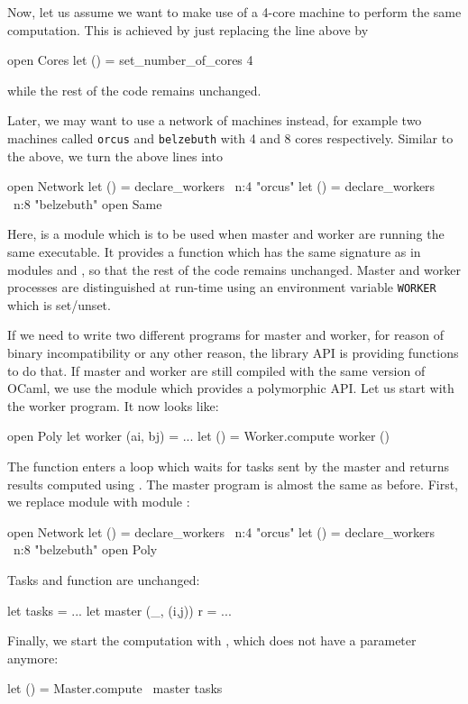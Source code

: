\documentclass[a4paper,12pt]{article}
\newcommand{\Ocaml}{OCaml}
\begin{document}
Now, let us assume we want to make use of a 4-core machine to perform
the same computation. 
This is achieved by just replacing the line above by
\begin{ocaml}
  open Cores
  let () = set_number_of_cores 4
\end{ocaml}
while the rest of the code remains unchanged.

Later, we may want to use a network of machines instead, for example
two machines called \texttt{orcus} and \texttt{belzebuth} with 4 and 8
cores respectively. Similar to the above, we turn the above lines into
\begin{ocaml}
  open Network
  let () = declare_workers ~n:4 "orcus"
  let () = declare_workers ~n:8 "belzebuth"
  open Same
\end{ocaml}
Here,  is a module which is to be used when master and worker
are running the same executable. It provides a  function
which has the same signature as in modules  and
, so that the rest of the code remains unchanged. Master and
worker processes are distinguished at run-time using an environment
variable \texttt{WORKER} which is set/unset.

If we need to write two different programs for master and worker, for
reason of binary incompatibility or any other reason, the library API
is providing functions to do that. If master and worker are still
compiled with the same version of \Ocaml, we use the  module
which provides a polymorphic API. Let us start with the worker program.
It now looks like:
\begin{ocaml}
  open Poly
  let worker (ai, bj) = ...
  let () = Worker.compute worker ()
\end{ocaml}
The  function enters a loop which waits for
tasks sent by the master and returns results computed using .
The master program is almost the same as before. First, we replace
module  with module :
\begin{ocaml}
  open Network
  let () = declare_workers ~n:4 "orcus"
  let () = declare_workers ~n:8 "belzebuth"
  open Poly
\end{ocaml}
Tasks and  function are unchanged:
\begin{ocaml}
  let tasks = ...
  let master (_, (i,j)) r = ...
\end{ocaml}
Finally, we start the computation with , which does
not have a  parameter anymore:
\begin{ocaml}
  let () = Master.compute ~master tasks
\end{ocaml}
\end{document}
